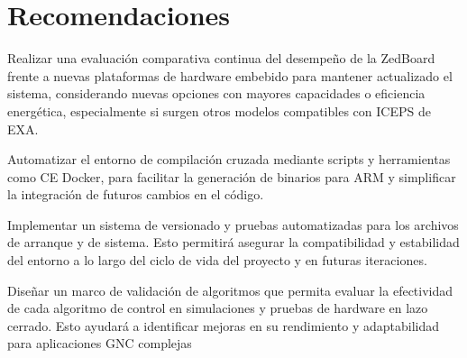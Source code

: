 \chapter{Recomendaciones}

Realizar una evaluación comparativa continua del desempeño de la ZedBoard frente a nuevas plataformas de hardware embebido para mantener actualizado el sistema, considerando nuevas opciones con mayores capacidades o eficiencia energética, especialmente si surgen otros modelos compatibles con ICEPS de EXA.
	
Automatizar el entorno de compilación cruzada mediante scripts y herramientas como CE Docker, para facilitar la generación de binarios para ARM y simplificar la integración de futuros cambios en el código.

Implementar un sistema de versionado y pruebas automatizadas para los archivos de arranque y de sistema. Esto permitirá asegurar la compatibilidad y estabilidad del entorno a lo largo del ciclo de vida del proyecto y en futuras iteraciones.

Diseñar un marco de validación de algoritmos que permita evaluar la efectividad de cada algoritmo de control en simulaciones y pruebas de hardware en lazo cerrado. Esto ayudará a identificar mejoras en su rendimiento y adaptabilidad para aplicaciones GNC complejas